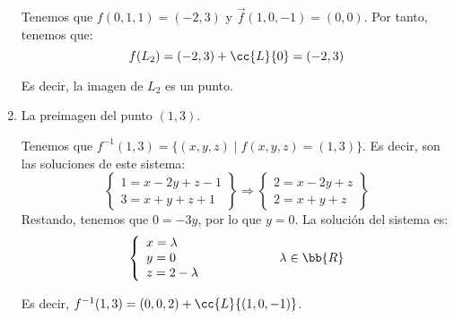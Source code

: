 \begin{ejercicio}
\begin{enumerate}
        Tenemos que $f(0,1,1)=(-2, 3)$ y $\vec{f}(1,0,-1)=(0, 0)$. Por tanto, tenemos que:
        \begin{equation*}
            f(L_2)=(-2,3)+\cc{L}\{0\} = (-2,3)
        \end{equation*}
        
        Es decir, la imagen de $L_2$ es un punto.

        \item La preimagen del punto $(1, 3)$.

        Tenemos que $f^{-1}(1,3) = \{(x,y,z)\mid f(x,y,z)=(1,3)\}$. Es decir, son las soluciones de este sistema:
        \begin{equation*}
            \left\{
            \begin{array}{l}
                1 = x-2y+z-1\\
                3 = x+y+z+1
            \end{array}
            \right\} \Longrightarrow
            \left\{
            \begin{array}{l}
                2 = x-2y+z\\
                2 = x+y+z
            \end{array}
            \right\}
        \end{equation*}
        Restando, tenemos que $0=-3y$, por lo que $y=0$. La solución del sistema es:
        \begin{equation*}
            \left\{
            \begin{array}{l}
                x = \lambda \\
                y = 0 \\
                z = 2-\lambda
            \end{array}
            \right. \hspace{2cm} \lambda\in \bb{R}
        \end{equation*}

        Es decir, $f^{-1}(1,3)=(0,0,2) + \cc{L}\{(1,0,-1)\}$.        
    \end{enumerate}
\end{ejercicio}

